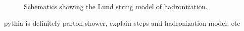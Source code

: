  \begin{figure}[htb]
  \begin{center}
  \end{center}
  \caption[Schematics showing the Lund string model of hadronization]
	  {Schematics showing the Lund string model of hadronization.}
  \label{fig:MClund}
 \end{figure}



pythia is definitely parton shower, 
explain steps and hadronization model, etc


